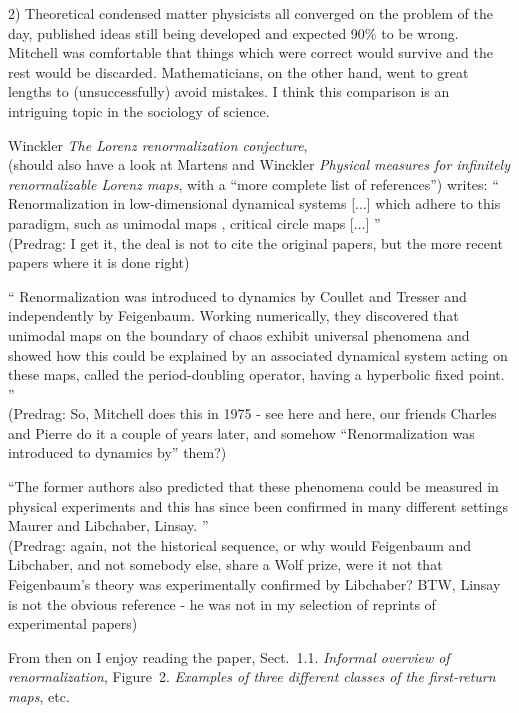 \begin{description}
2) Theoretical condensed matter physicists all converged on the problem
of the day, published ideas still being developed and expected 90\% to be
wrong. Mitchell was comfortable that things which were correct would survive
and the rest would be discarded. Mathematicians, on the other hand, went
to great lengths to (unsuccessfully) avoid mistakes. I think this
comparison is an intriguing topic in the sociology of science.

\newpage %
\item[2018-05-03 Bj{\"o}rn]
{Winckler}
{\em The {Lorenz} renormalization conjecture}, \\
(should also have a look at Martens and Winckler {\em
Physical measures for infinitely renormalizable {Lorenz} maps}, with a
``more complete list of references'')
writes: ``
Renormalization in low-dimensional dynamical systems [...] which adhere
to this paradigm, such as unimodal maps
\cite{Sullivan92,McMullen96,AviLyu11}, critical circle maps
\cite{deFaria92,Yampolsky03} [...]
''
\\(Predrag: I get it, the deal is not to cite the original papers,
but the more recent papers where it is done right)

``
Renormalization was introduced to dynamics by Coullet and
Tresser and independently by Feigenbaum.
Working numerically, they discovered that unimodal maps on the boundary
of chaos exhibit universal phenomena and showed how this could be
explained by an associated dynamical system acting on these maps, called
the period-doubling operator, having a hyperbolic fixed point.
''
\\(Predrag: So, Mitchell does this in 1975 - see
 {here}
and  {here}, our
friends Charles and Pierre do it a couple of years later, and somehow
``Renormalization was introduced to dynamics by'' them?)

``The former authors also predicted that these phenomena could be
measured in physical experiments and this has since been confirmed in
many different settings Maurer and Libchaber, Linsay.
''
\\(Predrag: again, not the historical sequence, or why would Feigenbaum
and Libchaber, and not somebody else, share a Wolf prize, were it not
that Feigenbaum's theory was experimentally confirmed by Libchaber?
BTW, Linsay is not the obvious reference - he was not
in my selection of reprints of experimental papers)

From then on I enjoy reading the paper, Sect.~1.1. {\em Informal overview
of renormalization}, Figure~2. \emph{Examples of three different classes
of the first-return maps}, etc.



\item[2019-12-29 Predrag]

\end{description}



\printbibliography[heading=subbibintoc,title={References}]
